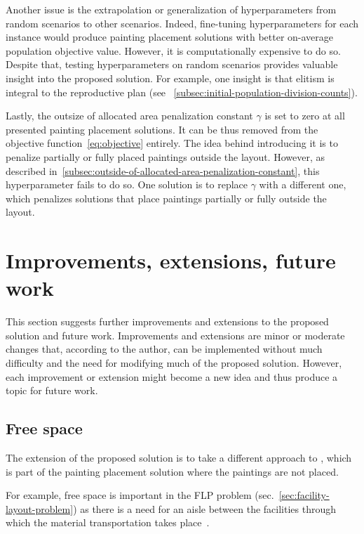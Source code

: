 Another issue is the extrapolation or generalization of hyperparameters from random scenarios to other scenarios.
Indeed, fine-tuning hyperparameters for each instance would produce painting placement solutions with better on-average population objective value.
However, it is computationally expensive to do so.
Despite that, testing hyperparameters on random scenarios provides valuable insight into the proposed solution.
For example, one insight is that elitism is integral to the reproductive plan (see ~\ref{subsec:initial-population-division-counts}).

Lastly, the outsize of allocated area penalization constant $\gamma$ is set to zero at all presented painting placement solutions.
It can be thus removed from the objective function~\ref{eq:objective} entirely.
The idea behind introducing it is to penalize partially or fully placed paintings outside the layout.
However, as described in~\ref{subsec:outside-of-allocated-area-penalization-constant}, this hyperparameter fails to do so.
One solution is to replace $\gamma$ with a different one,
which penalizes solutions that place paintings partially or fully outside the layout.


\section{Improvements, extensions, future work}\label{sec:improvements}
This section suggests further improvements and extensions to the proposed solution
and future work.
Improvements and extensions are minor or moderate changes that, according to the author,
can be implemented without much difficulty and the need for modifying
much of the proposed solution.
However, each improvement or extension might become a new idea and thus produce a topic for future work.

\subsection{Free space}\label{subsec:free-space}

The extension of the proposed solution is to take a different approach to
, which is part of the painting placement solution where the paintings are not placed.

For example, free space is important in the FLP problem (sec.~\ref{sec:facility-layout-problem})
as there is a need for an aisle between the facilities
through which the material transportation takes place~\cite{scholzExtensionsSTaTSPractical2010}.

